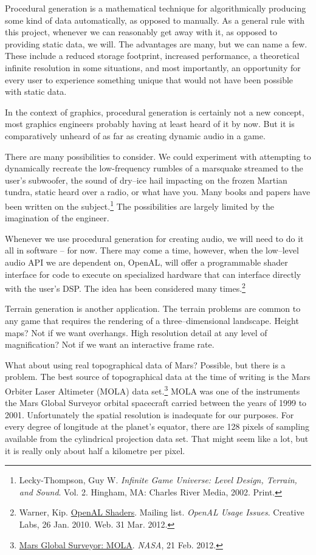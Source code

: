 Procedural generation is a mathematical technique for algorithmically producing some kind of data automatically, as opposed to manually. As a general rule with this project, whenever we can reasonably get away with it, as opposed to providing static data, we will. The advantages are many, but we can name a few. These include a reduced storage footprint, increased performance, a theoretical infinite resolution in some situations, and most importantly, an opportunity for every user to experience something unique that would not have been possible with static data.

In the context of graphics, procedural generation is certainly not a new concept, most graphics engineers probably having at least heard of it by now. But it is comparatively unheard of as far as creating dynamic audio in a game. 

There are many possibilities to consider. We could experiment with attempting to dynamically recreate the low-frequency rumbles of a marsquake streamed to the user's subwoofer, the sound of dry--ice hail impacting on the frozen Martian tundra, static heard over a radio, or what have you. Many books and papers have been written on the subject.\footnote{Lecky-Thompson, Guy W. {\it Infinite Game Universe: Level Design, Terrain, and Sound}. Vol. 2. Hingham, MA: Charles River Media, 2002. Print.} The possibilities are largely limited by the imagination of the engineer.

Whenever we use procedural generation for creating audio, we will need to do it all in software -- for now. There may come a time, however, when the low--level audio API we are dependent on, OpenAL, will offer a programmable shader interface for code to execute on specialized hardware that can interface directly with the user's DSP. The idea has been considered many times.\footnote{Warner, Kip. \href{http://opensource.creative.com/pipermail/openal/2010-January/011972.html}{OpenAL Shaders}. Mailing list. {\it OpenAL Usage Issues}. Creative Labs, 26 Jan. 2010. Web. 31 Mar. 2012.}

Terrain generation is another application. The terrain problems are common to any game that requires the rendering of a three--dimensional landscape. Height maps? Not if we want overhangs. High resolution detail at any level of magnification? Not if we want an interactive frame rate.

What about using real topographical data of Mars? Possible, but there is a problem. The best source of topographical data at the time of writing is the Mars Orbiter Laser Altimeter (MOLA) data set.\footnote{\href{http://pds-geosciences.wustl.edu/missions/mgs/mola.html}{Mars Global Surveyor: MOLA}. {\it NASA}, 21 Feb. 2012.} MOLA was one of the instruments the Mars Global Surveyor orbital spacecraft carried between the years of 1999 to 2001. Unfortunately the spatial resolution is inadequate for our purposes. For every degree of longitude at the planet's equator, there are 128 pixels of sampling available from the cylindrical projection data set. That might seem like a lot, but it is really only about half a kilometre per pixel.

